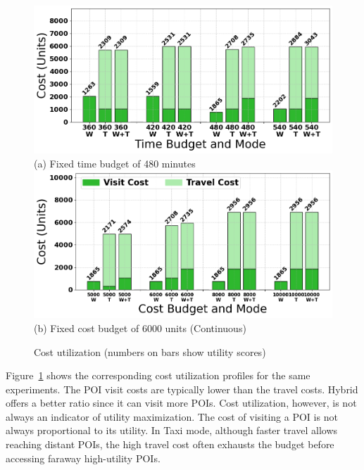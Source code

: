 
\begin{figure}[t]
\centering
\includegraphics[width=\columnwidth]{plots/cu5.png}
(a) Fixed time budget of 480 minutes
\includegraphics[width=\columnwidth]{plots/CU1.png}
(b) Fixed cost budget of 6000 units (Continuous)
\caption{Cost utilization (numbers on bars show utility scores)}
\label{fig:cost-utilization}
\end{figure}

Figure~\ref{fig:cost-utilization} shows the corresponding cost utilization profiles for the same experiments.
The POI visit costs are typically lower than the travel costs.
Hybrid offers a better ratio since it can visit more POIs.
Cost utilization, however, is not always an indicator of utility maximization.
The cost of visiting a POI is not always proportional to its utility.
In Taxi mode, although faster travel allows reaching distant POIs, the high travel cost often exhausts the budget before accessing faraway high-utility POIs.

